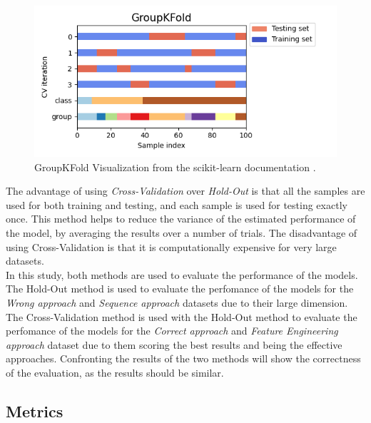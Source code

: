 \begin{itemize}
                    \begin{figure}[H]
                        \centering
                        \includegraphics[width=1.0\textwidth]{../src/resources/groupkfold.png}
                        \caption{
                          GroupKFold Visualization from the scikit-learn documentation \cite{scikit-learn}.
                        }
                        \label{fig:groupkfold}
                    \end{figure}
                \end{itemize}
                
        The advantage of using \textit{Cross-Validation} over \textit{Hold-Out} is that all the samples are used for both training and testing, and each sample is used for testing exactly once. This method helps to reduce the variance of the estimated performance of the model, by averaging the results over a number of trials. The disadvantage of using Cross-Validation is that it is computationally expensive for very large datasets. \\ 

        In this study, both methods are used to evaluate the performance of the models. The Hold-Out method is used to evaluate the perfomance of the models for the \textit{Wrong approach} and \textit{Sequence approach} datasets due to their large dimension. The Cross-Validation method is used  with the Hold-Out method to evaluate the perfomance of the models for the \textit{Correct approach} and \textit{Feature Engineering approach} dataset due to them scoring the best results and being the effective approaches. Confronting the results of the two methods will show the correctness of the evaluation, as the results should be similar. \\
        
        \subsection{Metrics}

